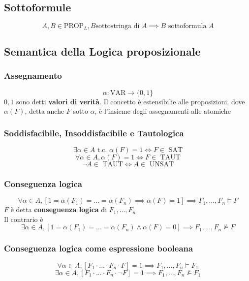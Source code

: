 \documentclass{report}
\begin{document}
    \subsection{Sottoformule}
        $$A, B \in \textrm{PROP}_L, B \textrm{sottostringa di } A \implies B \textrm{ sottoformula } A$$
    \subsection{Semantica della Logica proposizionale}
        \subsubsection{Assegnamento}
            $$\alpha: \textrm{VAR} \rightarrow \{0,1\}$$
            $0,1$ sono detti \textbf{valori di verità}.
            Il concetto è estensibilie alle proposizioni, dove $\alpha\left(F\right)$, detta anche 
            $F$ sotto $\alpha$, è l'insieme degli assegnamenti alle atomiche 
        \subsubsection{Soddisfacibile, Insoddisfacibile e Tautologica}
            $$\exists \alpha \in A \textrm{ t.c. } \alpha\left(F\right) = 1 \iff F \in \textrm{ SAT}$$
            $$\forall \alpha \in A, \alpha\left(F\right) = 1 \iff F \in \textrm{ TAUT}$$
            $$\neg A \in \textrm{ TAUT} \iff A \in \textrm{ UNSAT}$$
        \subsubsection{Conseguenza logica}
            $$\forall \alpha \in A, \left[1 = \alpha\left(F_1\right) = ... = \alpha\left(F_n\right) 
                \implies \alpha\left(F\right) = 1\right] \implies F_1, ..., F_n \models F$$
            $F$ è detta \textbf{conseguenza logica} di $F_1, ..., F_n$ \\
            Il contrario è 
            $$\exists \alpha \in A, \left[1 = \alpha\left(F_1\right) = ... = \alpha\left(F_n\right) 
                \wedge \alpha\left(F\right) = 0\right] \implies F_1, ..., F_n \not\models F$$
        \subsubsection{Conseguenza logica come espressione booleana}
            $$\forall \alpha \in A, \left[F_1 \cdot ... \cdot F_n \cdot F\right] = 1 
                \implies F_1, ..., F_n \models F_1$$
            $$\exists \alpha \in A, \left[F_1 \cdot ... \cdot F_n \cdot \neg F\right] = 1 
                \implies F_1, ..., F_n \not\models F_1$$
\end{document}
